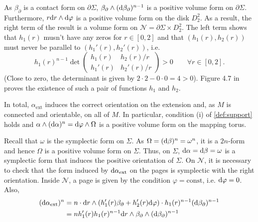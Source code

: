 As $\beta_\partial$ is a contact form on $\partial \Sigma$, $\beta_\partial \wedge (\mathrm{d}\beta_\partial)^{n-1}$ is a positive volume form on $\partial \Sigma$. 
Furthermore, $r \mathrm{d} r\wedge \mathrm{d} \varphi$ is a positive volume form on the disk $D_2^2$. 
As a result, the right term of the result is a volume form on $\mathcal{N} = \partial \Sigma \times D_2^2$.
The left term shows that $h_1(r)$ musn't have any zeros for $r \in [0,2]$ and that $(h_1(r), h_2(r))$ must never be parallel to $(h_1'(r), h_2'(r))$, i.e.
\[
    h_1(r)^{n-1}\det \begin{pmatrix}
        h_1(r) & h_2(r)/r\\
        h_1'(r) & h_2'(r)/r
    \end{pmatrix} > 0 \qquad \forall r \in [0,2].
\]
(Close to zero, the determinant is given by $2 \cdot 2 - 0 \cdot 0 = 4 > 0$).
Figure 4.7 in \cite{Geiges08} proves the existence of such a pair of functions $h_1$ and $h_2$.


In total, $\alpha_\text{ext}$ induces the correct orientation on the extension and,
as $M$ is connected and orientable, on all of $M$.
In particular, condition (i) of \cref{def:support} holds and $\alpha \wedge (\mathrm{d} \alpha)^n = \mathrm{d} \varphi \wedge \Omega$ is a positive volume form on the mapping torus. 

Recall that $\omega$ is the symplectic form on $\Sigma$.
As $\Omega = (\mathrm{d} \beta)^n = \omega^n$, it is a $2n$-form and hence $\Omega$ is a positive volume form on $\Sigma$. 
Thus, on $\Sigma$, $\mathrm{d} \alpha = \mathrm{d} \beta = \omega$ is a symplectic form that induces the positive orientation of $\Sigma$. 
On $\mathcal{N}$, it is necessary to check that the form induced by $\mathrm{d} \alpha_\text{ext}$ on the pages is symplectic with the right orientation.
Inside $\mathcal{N}$, a page is given by the condition $\varphi = \mathrm{const}$, i.e. $\mathrm{d} \varphi = 0$.
Also,
\begin{align*}
    (\mathrm{d} \alpha_\text{ext})^n &= n\cdot \mathrm{d} r\wedge (h_1'(r) \beta_\partial + h_2'(r) \mathrm{d}\varphi) \cdot h_1(r)^{n-1}(\mathrm{d} \beta_\partial)^{n-1}\\
    &= n h_1'(r)h_1(r)^{n-1} \mathrm{d} r \wedge \beta_\partial \wedge (\mathrm{d} \beta_\partial)^{n-1}
\end{align*}

